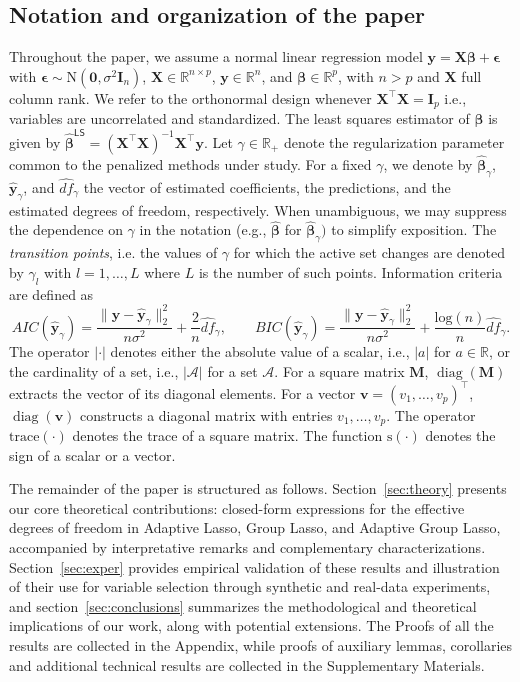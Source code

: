 \documentclass[a4paper, 12pt]{article}
\newcommand{\sgn}{\mathrm{s}}
\newcommand{\trace}{\mathrm{trace}}
\DeclareMathOperator{\diag}{diag}
\def\bbeta{\boldsymbol{\beta}}
\def\bepsilon{\boldsymbol{\epsilon}}
\def\bv{\boldsymbol{v}}
\def\by{\boldsymbol{y}}
\def\bI{\mathbf{I}}
\def\bM{\mathbf{M}}
\def\bX{\mathbf{X}}
\def\bv{\mathbf{v}}
\def\by{\mathbf{y}}
\begin{document}
\subsection{Notation and organization of the paper}
Throughout the paper, we assume a normal linear regression model $\by = \bX \bbeta + \bepsilon$ with $\bepsilon \sim \text{N}(\boldsymbol{0}, \sigma^2 \bI_n)$, $\bX \in \mathbb{R}^{n \times p}$, $\by \in \mathbb{R}^n$, and $\bbeta \in \mathbb{R}^p$, with $n>p$ and $\bX$ full column rank. We refer to the orthonormal design whenever $\bX^\top \bX = \bI_p$ i.e., variables are uncorrelated and standardized.
The least squares estimator of $\bbeta$ is given by $\widehat{\bbeta}^{\mathsf{LS}}=(\bX^\top\bX)^{-1}\bX^\top\by$.
Let $\gamma \in \mathbb{R}_+$ denote the regularization parameter common to the penalized methods under study. For a fixed $\gamma$,  we denote by $\widehat{\bbeta}_\gamma$, $\widehat{\by}_\gamma$, and $\widehat{df}_\gamma$ the vector of estimated coefficients, the predictions, and the estimated degrees of freedom, respectively. 
When unambiguous, we may suppress the dependence on $\gamma$ in the notation (e.g., $\widehat{\bbeta}$ for $\widehat{\bbeta}_\gamma)$ to simplify exposition. The \emph{transition points}, i.e. the values of $\gamma$ for which the active set changes are denoted by $\gamma_l$ with $l=1, \dots, L$ where $L$ is the number of such points.
%
Information criteria are defined as 
\begin{equation}
\label{eq:BIC}
     AIC(\widehat{\by}_\gamma) = \frac{\lVert \by - \widehat{\by}_\gamma \rVert_2^2}{n\sigma^2} + \frac{2}{n} \widehat{df}_\gamma, \quad \quad 
    BIC(\widehat{\by}_\gamma) = \frac{\lVert \by - \widehat{\by}_\gamma \rVert_2^2}{n\sigma^2} + \frac{\text{log}(n)}{n} \widehat{df}_\gamma.   
\end{equation}
The operator $|\cdot|$ denotes either the absolute value of a scalar, i.e., $|a|$ for $a \in \mathbb{R}$, or the cardinality of a set, i.e., $|\mathcal{A}|$ for a set $\mathcal{A}$.
For a square matrix $\bM$, $\diag(\bM)$ extracts the vector of its diagonal elements. For a vector $\bv = (v_1, \dots, v_p)^\top$, $\diag(\bv)$ constructs a diagonal matrix with entries $v_1, \dots, v_p$. The operator $\trace(\cdot)$ denotes the trace of a square matrix. The function $\sgn(\cdot)$ denotes the sign of a scalar or a vector.\par
%
The remainder of the paper is structured as follows. Section~\ref{sec:theory} presents our core theoretical contributions: closed-form expressions for the effective degrees of freedom in Adaptive Lasso, Group Lasso, and Adaptive Group Lasso, accompanied by interpretative remarks and complementary characterizations. Section~\ref{sec:exper} provides empirical validation of these results and illustration of their use for variable selection through synthetic and real-data experiments, and section~\ref{sec:conclusions} summarizes the methodological and theoretical implications of our work, along with potential extensions. The Proofs of all the results are collected in the Appendix, while proofs of  auxiliary lemmas, corollaries and additional technical results are collected in the Supplementary Materials.
\end{document}

